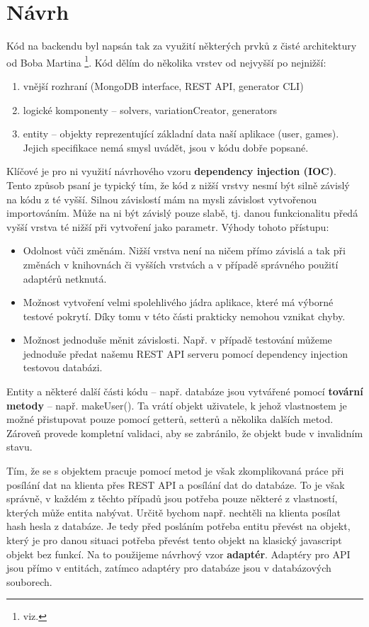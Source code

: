 \documentclass[a4paper,oneside,12pt]{report}
\begin{document}
\section{Návrh}
Kód na backendu byl napsán tak za využití některých prvků z čisté architektury od Boba Martina \footnote{viz. }. Kód dělím do několika vrstev od nejvyšší po nejnižší:
\begin{enumerate}
   \item vnější rozhraní (MongoDB interface, REST API, generator CLI)
   \item logické komponenty -- solvers, variationCreator, generators
   \item entity -- objekty reprezentující základní data naší aplikace (user, games). Jejich specifikace nemá smysl uvádět, jsou v kódu dobře popsané.
\end{enumerate}

Klíčové je pro ni využití návrhového vzoru \textbf{dependency injection (IOC)}. Tento způsob psaní je typický tím, že kód z nižší vrstvy nesmí být silně závislý na kódu z té vyšší. Silnou závislostí mám na mysli závislost vytvořenou importováním. Může na ni být závislý pouze slabě, tj. danou funkcionalitu předá vyšší vrstva té nižší při vytvoření jako parametr. Výhody tohoto přístupu:

\begin{itemize}
   \item Odolnost vůči změnám. Nižší vrstva není na ničem přímo závislá a tak při změnách v knihovnách či vyšších vrstvách a v případě správného použití adaptérů netknutá.
   \item Možnost vytvoření velmi spolehlivého jádra aplikace, které má výborné testové pokrytí. Díky tomu v této části prakticky nemohou vznikat chyby.
   \item Možnost jednoduše měnit závislosti. Např. v případě testování můžeme jednoduše předat našemu REST API serveru pomocí dependency injection testovou databázi. 
\end{itemize}

Entity a některé další části kódu -- např. databáze jsou vytvářené pomocí \textbf{tovární metody} -- např. makeUser({}). Ta vrátí objekt uživatele, k jehož vlastnostem je možné přistupovat pouze pomocí getterů, setterů a několika dalších metod. Zároveň provede kompletní validaci, aby se zabránilo, že objekt bude v invalidním stavu. 

Tím, že se s objektem pracuje pomocí metod je však zkomplikovaná práce při posílání dat na klienta přes REST API a posílání dat do databáze. To je však správně, v každém z těchto případů jsou potřeba pouze některé z vlastností, kterých může entita nabývat. Určitě bychom např. nechtěli na klienta posílat hash hesla z databáze. Je tedy před posláním potřeba entitu převést na objekt, který je pro danou situaci potřeba převést tento objekt na klasický javascript objekt bez funkcí. Na to použijeme návrhový vzor \textbf{adaptér}. Adaptéry pro API jsou přímo v entitách, zatímco adaptéry pro databáze jsou v databázových souborech.
\end{document}
